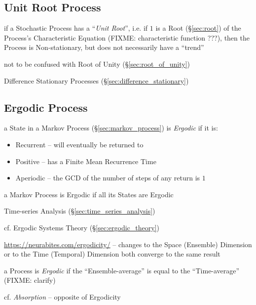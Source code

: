 \subsection{Unit Root Process}\label{sec:unit_root}

if a Stochastic Process has a ``\emph{Unit Root}'', i.e. if $1$ is a Root
(\S\ref{sec:root}) of the Process's Characteristic Equation (FIXME:
characteristic function ???), then the Process is Non-stationary, but does not
necessarily have a ``trend''

\fist not to be confused with Root of Unity (\S\ref{sec:root_of_unity})

Difference Stationary Processes (\S\ref{sec:difference_stationary})



\subsection{Ergodic Process}\label{sec:ergodic_process}

a State in a Markov Process (\S\ref{sec:markov_process}) is \emph{Ergodic} if it
is:
\begin{itemize}
  \item Recurrent -- will eventually be returned to
  \item Positive -- has a Finite Mean Recurrence Time
  \item Aperiodic -- the GCD of the number of steps of any return is $1$
\end{itemize}
a Markov Process is Ergodic if all its States are Ergodic

\fist Time-series Analysis (\S\ref{sec:time_series_analysis})

\fist cf. Ergodic Systems Theory (\S\ref{sec:ergodic_theory})

\url{https://neurabites.com/ergodicity/} -- changes to the Space (Ensemble)
Dimension or to the Time (Temporal) Dimension both converge to the same result

a Process is \emph{Ergodic} if the ``Ensemble-average'' is equal to the
``Time-average'' (FIXME: clarify)

cf. \emph{Absorption} -- opposite of Ergodicity



